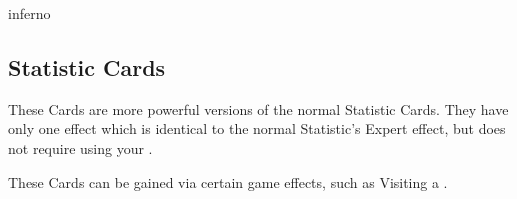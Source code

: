 \begin{paracol}{2}
\begin{expansion}{inferno}
\begin{minipage}[t]{0.65\linewidth}
      \subsection*{ Statistic Cards}
      These Cards are more powerful versions of the normal Statistic Cards.
      They have only one effect which is identical to the normal Statistic's Expert effect, but does not require using your .\par

      \medskip
      These Cards can be gained via certain game effects, such as Visiting a .
    \end{minipage}
  \end{expansion}
\end{paracol}
\vspace*{2em}
